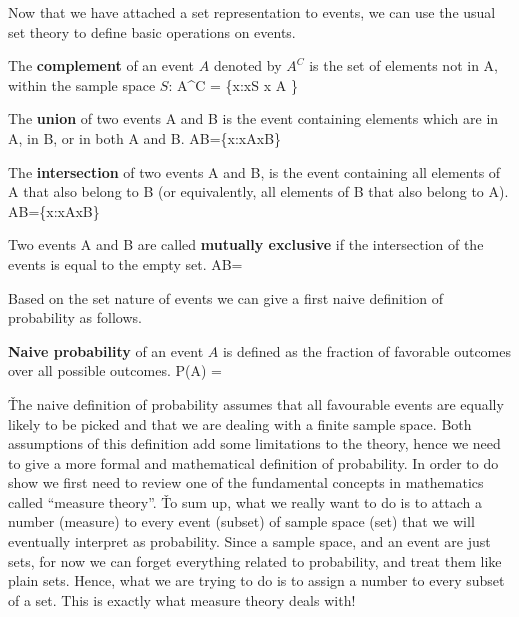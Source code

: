 
Now that we have attached a set representation to events, we can use the usual set theory to define basic operations 
on events.

The \textbf{complement} of an event $A$ denoted by $A^{C}$ is the set of elements not in A, within the sample space $S$:
\bse
A^{C} = \{x:x\in S \mid x \notin A \}
\ese
\ed

\vspace{-5pt}


\bd[Union]
The \textbf{union} of two events A and B is the event containing elements which are in A, in B, or in both A and B.
\bse
A\cup B=\{x:x\in A{}x\in B\}
\ese
\ed


\bd[Intersection]
The \textbf{intersection} of two events A and B, is the event containing all elements of A that also belong to B (or 
equivalently, all elements of B that also belong to A).
\bse
A\cap B=\{x:x\in A{}x\in B\}
\ese
\ed

\vspace{-5pt}


Two events A and B are called \textbf{mutually exclusive} if the intersection of the events is equal to the empty set.
\bse
A\cap B= \emptyset
\ese
\ed


Based on the set nature of events we can give a first naive definition of probability as follows.

\textbf{Naive probability} of an event $A$ is defined as the fraction of favorable outcomes over all possible outcomes.
\bse
P(A) = 
\ese
\ed

\v

The naive definition of probability assumes that all favourable events are equally likely to be picked and that we 
are dealing with a finite sample space. Both assumptions of this definition add some limitations to the theory, hence
we need to give a more formal and mathematical definition of probability. In order to do show we first need to review
one of the fundamental concepts in mathematics called ``measure theory''. \v

To sum up, what we really want to do is to attach a number (measure) to every event (subset) of sample space (set) 
that we will eventually interpret as probability. Since a sample space, and an event are just sets, for now we can 
forget everything related to probability, and treat them like plain sets. Hence, what we are trying to do is to 
assign a number to every subset of a set. This is exactly what measure theory deals with!


